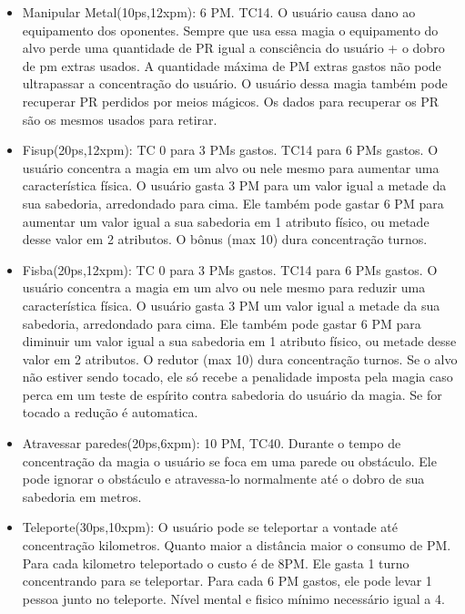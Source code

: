 \begin{itemize}
	
	\item Manipular Metal(10ps,12xpm): 6 PM. TC14.\newline
O usuário causa dano ao equipamento dos oponentes. Sempre que usa essa magia o equipamento do alvo perde uma quantidade de PR igual a consciência do usuário + o dobro de pm extras usados. A quantidade máxima de PM extras gastos não pode ultrapassar a concentração do usuário. O usuário dessa magia também pode recuperar PR perdidos por meios mágicos. Os dados para recuperar os PR são os mesmos usados para retirar.

	\item Fisup(20ps,12xpm): TC 0 para 3 PMs gastos. TC14 para 6 PMs gastos.\newline
O usuário concentra a magia em um alvo ou nele mesmo para aumentar uma característica física. O usuário gasta 3 PM para um valor igual a metade da sua sabedoria, arredondado para cima. Ele também pode gastar 6 PM para aumentar um valor igual a sua sabedoria em 1 atributo físico, ou metade desse valor em 2 atributos. O bônus (max 10) dura concentração turnos.
	
	\item Fisba(20ps,12xpm): TC 0 para 3 PMs gastos. TC14 para 6 PMs gastos.\newline 
O usuário concentra a magia em um alvo ou nele mesmo para reduzir uma característica física. O usuário gasta 3 PM um valor igual a metade da sua sabedoria, arredondado para cima. Ele também pode gastar 6 PM para diminuir um valor igual a sua sabedoria em 1 atributo físico, ou metade desse valor em 2 atributos. O redutor (max 10) dura concentração turnos. Se o alvo não estiver sendo tocado, ele só recebe a penalidade imposta pela magia caso perca em um teste de espírito contra sabedoria do usuário da magia. Se for tocado a redução é automatica.

	\item Atravessar paredes(20ps,6xpm): 10 PM, TC40.\newline
Durante o tempo de concentração da magia o usuário se foca em uma parede ou obstáculo. Ele pode ignorar o obstáculo e atravessa-lo normalmente até o dobro de sua sabedoria em metros.

	\item Teleporte(30ps,10xpm): O usuário pode se teleportar a vontade até concentração kilometros. Quanto maior a distância maior o consumo de PM. Para cada kilometro teleportado o custo é de 8PM. Ele gasta 1 turno concentrando para se teleportar. Para cada 6 PM gastos, ele pode levar 1 pessoa junto no teleporte.  Nível mental e fisico mínimo necessário igual a 4.
  	

\end{itemize}
